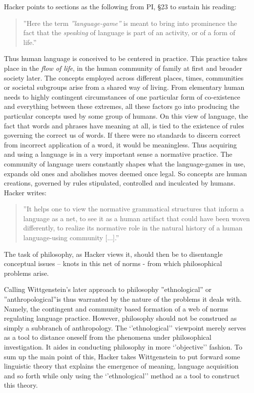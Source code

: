 \documentclass{article}
\begin{document}
Hacker points to sections as the following from PI, §23 to sustain his reading:
\begin{quote}
''Here the term \textit{''language-game''} is meant to bring into prominence
the fact that the \textit{speaking} of language is part of an activity, or of a form
of life.''
\end{quote}
Thus human language is conceived to be centered in practice. This practice takes place in the \textit{flow of life}, in the human community of family at first and broader society later. The concepts employed across different places, times, communities or societal subgroups arise from a shared way of living. From elementary human needs to highly contingent circumstances of one particular form of co-existence and everything between these extremes, all these factors go into producing the particular concepts used by some group of humans.
On this view of language, the fact that words and phrases have meaning at all, is tied to the existence of rules governing the correct us of words. If there were no standards to discern correct from incorrect application of a word, it would be meaningless. 
Thus acquiring and using a language is in a very important sense a normative practice. The community of language users constantly shapes what the language-games in use, expands old ones and abolishes moves deemed once legal.
So concepts are human creations, governed by rules stipulated, controlled and inculcated by humans. Hacker writes: \begin{quote}
''It helps one to view the normative grammatical structures that inform a language as a net, to see it as a human artifact that could have been woven differently, to realize its normative role in the natural history of a human language-using community [...].''
\end{quote} %
The task of philosophy, as Hacker views it, should then be to disentangle conceptual issues – knots in this net of norms - from which philosophical problems arise.

 Calling Wittgenstein's later approach to philosophy ''ethnological'' or ''anthropological''is thus warranted by the nature of the problems it deals with. Namely, the contingent and community based formation of a web of norms regulating language practice. However, philosophy should not be construed as simply a subbranch of anthropology. The ‘’ethnological’’ viewpoint merely serves as a tool to distance oneself from the phenomena under philosophical investigation. It aides in conducting philosophy in more ‘’objective’’ fashion.
To sum up the main point of this, Hacker takes Wittgenstein to put forward some linguistic theory that explains the emergence of meaning, language acquisition and so forth while only using the ‘’ethnological’’ method as a tool to construct this theory.
\end{document}
